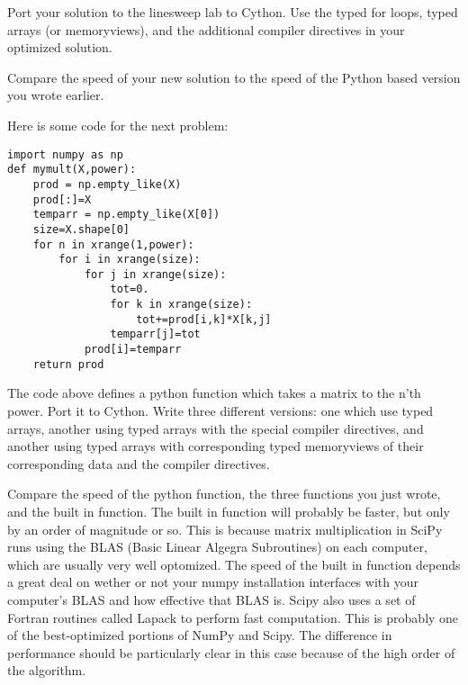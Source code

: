 \begin{problem}
Port your solution to the linesweep lab to Cython.
Use the typed for loops, typed arrays (or memoryviews), and the additional compiler directives in your optimized solution.

Compare the speed of your new solution to the speed of the Python based version you wrote earlier.
\end{problem}

Here is some code for the next problem:
\begin{verbatim}
import numpy as np
def mymult(X,power):
    prod = np.empty_like(X)
    prod[:]=X
    temparr = np.empty_like(X[0])
    size=X.shape[0]
    for n in xrange(1,power):
        for i in xrange(size):
            for j in xrange(size):
                tot=0.
                for k in xrange(size):
                    tot+=prod[i,k]*X[k,j]
                temparr[j]=tot
            prod[i]=temparr
    return prod
\end{verbatim}

\begin{problem}
The code above defines a python function which takes a matrix to the n'th power.
Port it to Cython. Write three different versions: one which use typed arrays, another using typed arrays with the special compiler directives, and another using typed arrays with corresponding typed memoryviews of their corresponding data and the compiler directives.

Compare the speed of the python function, the three functions you just wrote, and the built in  function.
The built in function will probably be faster, but only by an order of magnitude or so.
This is because matrix multiplication in SciPy runs using the BLAS (Basic Linear Algegra Subroutines) on each computer, which are usually very well optomized.
The speed of the built in function depends a great deal on wether or not your numpy installation interfaces with your computer's BLAS and how effective that BLAS is.
Scipy also uses a set of Fortran routines called Lapack to perform fast computation.
This is probably one of the best-optimized portions of NumPy and Scipy.
The difference in performance should be particularly clear in this case because of the high order of the algorithm.
\end{problem}
